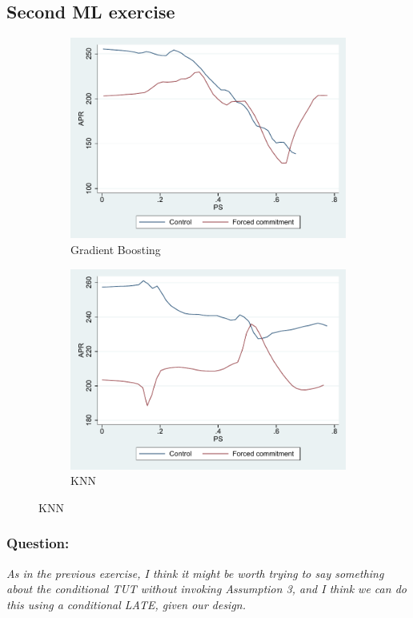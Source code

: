 \documentclass[oneside,11pt]{article}
\begin{document}
\subsection{Second ML exercise}




\begin{figure}[H]
    \caption{}
    \label{choose_wrong}
    \begin{center}
        \begin{subfigure}{0.45\textwidth}
        \caption{Gradient Boosting}
        \centering
        \includegraphics[width=\textwidth]{Figuras/ps_te_apr.pdf}
        
    \end{subfigure}
        \begin{subfigure}{0.45\textwidth}
        \caption{KNN}
        \centering
        \includegraphics[width=\textwidth]{Figuras/ps_te_apr1.pdf}
 \end{subfigure}
    \bigskip
        
    \end{center}
    
\end{figure}

\subsubsection{Question:}
\textit{As in the previous exercise, I think it might be worth trying to say something about the conditional TUT without invoking Assumption 3, and I think we can do this using a conditional LATE, given our design.}


\newpage
\clearpage
\end{document}
